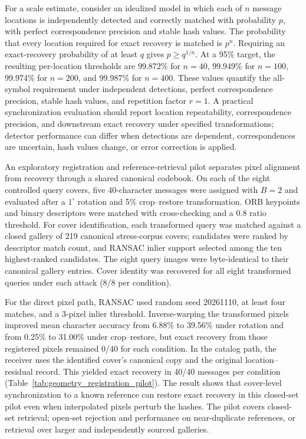 \documentclass[preprint,12pt]{elsarticle}
\theoremstyle{plain}
\providecommand{\DIFaddtex}[1]{{\protect\color{blue} \sf #1}} %
\providecommand{\DIFdeltex}[1]{{\protect\color{red} \scriptsize #1}} %
\providecommand{\DIFaddbegin}{} %
\providecommand{\DIFaddend}{} %
\providecommand{\DIFdelbegin}{} %
\providecommand{\DIFdelend}{} %
\providecommand{\DIFadd}[1]{\texorpdfstring{\DIFaddtex{#1}}{#1}} %
\providecommand{\DIFdel}[1]{\texorpdfstring{\DIFdeltex{#1}}{}} %
\providecommand{\DIFscaledelfig}{0.5}
\newlength{\DIFdelgraphicswidth} %
\newlength{\DIFdelgraphicsheight} %
\providecommand{\DIFaddincludegraphics}[2][]{{\color{blue}\fbox{\DIFOincludegraphics[#1]{#2}}}} %
\providecommand{\DIFdelincludegraphics}[2][]{%
\sbox{\DIFdelgraphicsbox}{\DIFOincludegraphics[#1]{#2}}%
\settoboxwidth{\DIFdelgraphicswidth}{\DIFdelgraphicsbox} %
\settoboxtotalheight{\DIFdelgraphicsheight}{\DIFdelgraphicsbox} %
\scalebox{\DIFscaledelfig}{%
\parbox[b]{\DIFdelgraphicswidth}{\usebox{\DIFdelgraphicsbox}\\[-\baselineskip] \rule{\DIFdelgraphicswidth}{0em}}\llap{\resizebox{\DIFdelgraphicswidth}{\DIFdelgraphicsheight}{%
\setlength{\unitlength}{\DIFdelgraphicswidth}%
\begin{picture}(1,1)%
\thicklines\linethickness{2pt} %
{\color[rgb]{1,0,0}\put(0,0){\framebox(1,1){}}}%
{\color[rgb]{1,0,0}\put(0,0){\line( 1,1){1}}}%
{\color[rgb]{1,0,0}\put(0,1){\line(1,-1){1}}}%
\end{picture}%
}\hspace*{3pt}}} %
} %
\DeclareRobustCommand{\DIFaddbegin}{\DIFOaddbegin \let\includegraphics\DIFaddincludegraphics} %
\DeclareRobustCommand{\DIFaddend}{\DIFOaddend \let\includegraphics\DIFOincludegraphics} %
\DeclareRobustCommand{\DIFdelbegin}{\DIFOdelbegin \let\includegraphics\DIFdelincludegraphics} %
\DeclareRobustCommand{\DIFdelend}{\DIFOaddend \let\includegraphics\DIFOincludegraphics} %
\renewcommand{\DIFdel}[1]{}
\renewcommand{\DIFdelincludegraphics}[2][]{}
\begin{document}
\DIFaddend For a scale estimate, consider an idealized model in which each of $n$
message locations is independently detected and correctly matched with
probability $p$, with perfect correspondence precision and stable hash values.
The probability that every location required for exact recovery is matched is
$p^n$. Requiring an exact-recovery probability of at least $q$ gives
$p\geq q^{1/n}$. At a 95\% target, the resulting per-location thresholds are
99.872\% for $n=40$, 99.949\% for $n=100$, 99.974\% for $n=200$, and
99.987\% for $n=400$. These values quantify the all-symbol requirement under
independent detections, perfect correspondence precision, stable hash values,
and repetition factor $r=1$. A practical synchronization evaluation should report
location repeatability, correspondence precision, and downstream exact
recovery under specified transformations; detector performance can differ
when detections are dependent, correspondences are uncertain, hash values
change, or error correction is applied.

An exploratory registration and reference-retrieval pilot separates pixel
alignment from recovery through a shared canonical codebook. On each of the
eight controlled query covers, five 40-character messages were assigned with
$B=2$ and evaluated after a $1^\circ$ rotation and 5\% crop--restore
transformation. ORB keypoints and binary descriptors \cite{rublee2011orb}
were matched with cross-checking and a 0.8 ratio threshold. For cover
identification, each transformed query was matched against a closed gallery
of 219 canonical stress-corpus covers; candidates were ranked by descriptor
match count, and RANSAC inlier support selected among the ten highest-ranked
candidates. The eight query images were byte-identical to their canonical
gallery entries. Cover identity was recovered for all eight transformed
queries under each attack (8/8 per condition).

For the direct pixel path, RANSAC used random seed 20261110, at least four
matches, and a 3-pixel inlier threshold. Inverse-warping the transformed
pixels improved mean character accuracy from 6.88\% to 39.56\% under rotation
and from 0.25\% to 31.00\% under crop--restore, but exact recovery from those
registered pixels remained 0/40 for each condition. In the catalog path, the
receiver uses the identified cover's canonical copy and the original
location--residual record. This yielded exact recovery in 40/40 messages per
condition (Table~\ref{tab:geometry_registration_pilot}). The result shows
that cover-level synchronization to a known reference can restore exact
recovery in this closed-set pilot even when interpolated pixels perturb the
hashes. \DIFdelbegin \DIFdel{It does not establish }\DIFdelend \DIFaddbegin \DIFadd{The pilot covers closed-set retrieval; }\DIFaddend open-set rejection \DIFdelbegin \DIFdel{, }\DIFdelend \DIFaddbegin \DIFadd{and }\DIFaddend performance on near-duplicate
references, or retrieval over larger and independently sourced galleries.
\end{document}

